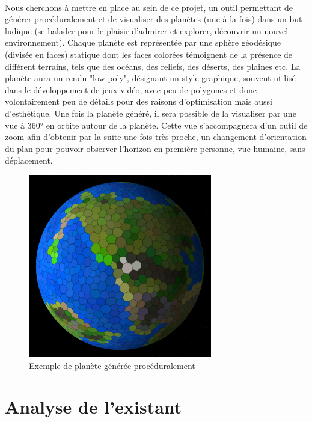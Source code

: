 \documentclass[a4paper]{article}
\begin{document}
\paragraph{}
Nous cherchons à mettre en place au sein de ce projet, un outil permettant de générer procéduralement et de visualiser des planètes (une à la fois) dans un but ludique (se balader pour le plaisir d'admirer et explorer, découvrir un nouvel environnement). Chaque planète est représentée par une sphère géodésique (divisée en faces) statique dont les faces colorées témoignent de la présence de différent terrains, tels que des océans, des reliefs, des déserts, des plaines etc. La planète aura un rendu "low-poly", désignant un style graphique, souvent utilisé dans le développement de jeux-vidéo, avec peu de polygones et donc volontairement peu de détails pour des raisons d'optimisation mais aussi d'esthétique. Une fois la planète généré, il sera possible de la visualiser par une vue à 360° en orbite autour de la planète. Cette vue s'accompagnera d'un outil de zoom afin d'obtenir par la suite une fois très proche, un changement d'orientation du plan pour pouvoir observer l'horizon en première personne, vue humaine, sans déplacement.

\begin{figure}[!h]
\begin{center} \includegraphics{img/planete.png} \end{center}
\caption{Exemple de planète générée procéduralement}
\end{figure}

\newpage
\section{Analyse de l'existant}
\end{document}
